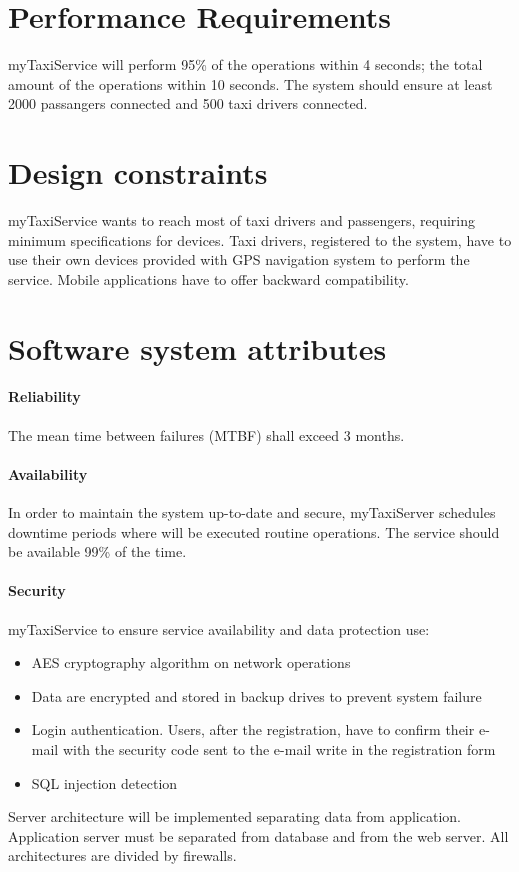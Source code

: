 \section{Performance Requirements}
myTaxiService will perform 95\% of the operations within 4 seconds; the total amount of the operations within 10 seconds.
The system should ensure at least 2000 passangers connected and 500 taxi drivers connected.

\section{Design constraints}
myTaxiService wants to reach most of taxi drivers and passengers, requiring minimum specifications for devices.
Taxi drivers, registered to the system, have to use their own devices provided with GPS navigation system to perform the service. Mobile applications have to offer backward compatibility.

\section{Software system attributes}
\paragraph{Reliability}
The mean time between failures (MTBF) shall exceed 3 months.
\paragraph{Availability}
In order to maintain the system up-to-date and secure, myTaxiServer schedules downtime periods where will be executed routine operations. The service should be available 99\% of the time.
\paragraph{Security}
myTaxiService to ensure service availability and data protection use:
\begin{itemize}
	\item AES cryptography algorithm on network operations
	\item Data are encrypted and stored in backup drives to prevent system failure
	\item Login authentication. Users, after the registration, have to confirm their e-mail with the security code sent to the e-mail write in the registration form
	\item SQL injection detection
\end{itemize}
Server architecture will be implemented separating
data from application. Application server must be separated
from database and from the web server. All architectures are divided by firewalls.
